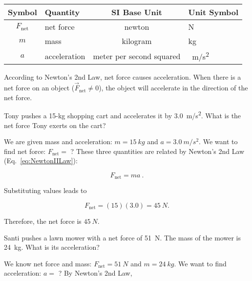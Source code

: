 \documentclass[main.tex]{subfiles}
\begin{document}
\begin{center}
    \begin{tabular}{cl|cl}
    \hline
    \textbf{Symbol} & \textbf{Quantity} & \textbf{SI Base Unit} & \textbf{Unit Symbol}  \\
    \hline\hline
    \rule{0pt}{2.5ex}
        $F_{\mathrm{net}}$ & net force & newton & N\\
        $m$ & mass & kilogram & kg\\
        $a$ & acceleration & meter per second squared & \SI{}{m/s^2}\\
    \hline
    \end{tabular}
\end{center}

According to Newton's 2nd Law, net force causes acceleration. When there is a net force on an object ($\vec{F}_{\text{net}} \neq 0$), the object will accelerate in the direction of the net force.


\begin{example} \label{ex:NetForce_Tony}
Tony pushes a 15-kg shopping cart and accelerates it by \SI{3.0}{m/s^2}. What is the net force Tony exerts on the cart?
\end{example}

\Solution We are given mass and acceleration: $m = \SI{15}{kg}$ and $a = \SI{3.0}{m/s^2}$. We want to find net force: $F_{\text{net}} =$ ? These three quantities are related by Newton's 2nd Law (Eq.~\ref{eq:NewtonIILaw}):

\begin{equation*}
    F_{\text{net}} = m a\ .
\end{equation*}

Substituting values leads to

\begin{equation*}
    F_{\text{net}} = (15)(3.0) = \SI{45}{N}.
\end{equation*}

Therefore, the net force is $\SI{45}{N}$. 

\endsolution

\begin{example} \label{ex:Solve_NIIL_a}
Santi pushes a lawn mower with a net force of \SI{51}{N}. The mass of the mower is \SI{24}{kg}. What is its acceleration?
\end{example}

\Solution We know net force and mass: $F_{\mathrm{net}} = \SI{51}{N}$ and $m = \SI{24}{kg}$. We want to find acceleration: $a =$ ? By Newton's 2nd Law,
\end{document}
